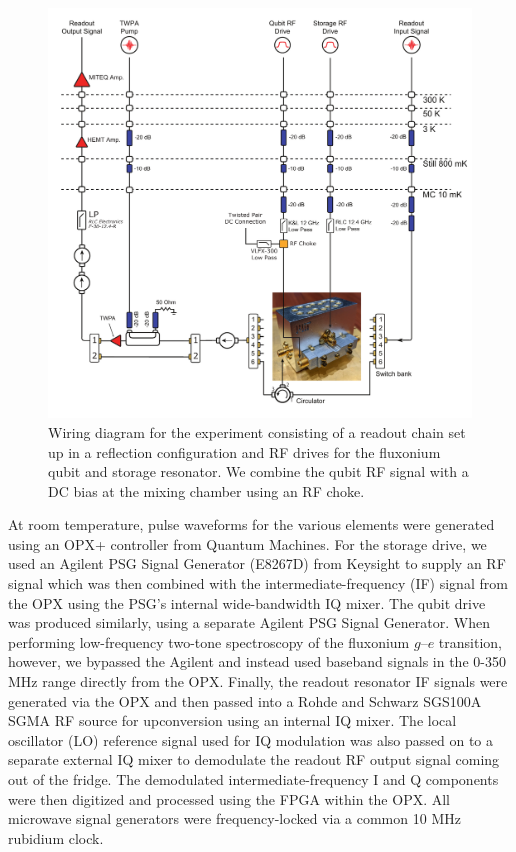 \begin{figure}[ht]
    \centering
    \includegraphics[width=0.95\linewidth]{Figures/4/Microwave-Wiring-Diagram.pdf}
    \caption{Wiring diagram for the experiment consisting of a readout chain set up in a reflection configuration and RF drives for the fluxonium qubit and storage resonator. We combine the qubit RF signal with a DC bias at the mixing chamber using an RF choke.}
    \label{fig:4-microwave-wiring-diagram}
\end{figure}

At room temperature, pulse waveforms for the various elements were generated using an OPX+ controller from Quantum Machines. For the storage drive, we used an Agilent PSG Signal Generator (E8267D) from Keysight to supply an RF signal which was then combined with the intermediate-frequency (IF) signal from the OPX using the PSG's internal wide-bandwidth IQ mixer. The qubit drive was produced similarly, using a separate Agilent PSG Signal Generator. When performing low-frequency two-tone spectroscopy of the fluxonium $g$--$e$ transition, however, we bypassed the Agilent and instead used baseband signals in the 0-350 MHz range directly from the OPX. Finally, the readout resonator IF signals were generated via the OPX and then passed into a Rohde and Schwarz SGS100A SGMA RF source for upconversion using an internal IQ mixer. The local oscillator (LO) reference signal used for IQ modulation was also passed on to a separate external IQ mixer to demodulate the readout RF output signal coming out of the fridge. The demodulated intermediate-frequency I and Q components were then digitized and processed using the FPGA within the OPX. All microwave signal generators were frequency-locked via a common 10 MHz rubidium clock. 

